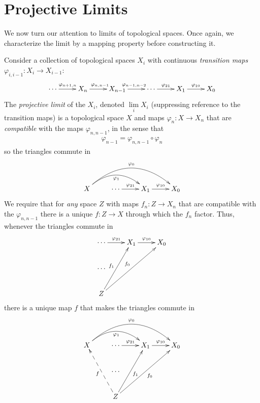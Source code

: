     \section{Projective Limits}
      We now turn our attention to limits of topological spaces.
      Once again, we characterize the limit by a mapping property before constructing it.
      \begin{defn}
        \label{defn:projlim}
        Consider a collection of topological spaces $X_i$ with continuous \emph{transition maps} $\varphi_{i,i-1}:X_i\rightarrow X_{i-1}$:
        \begin{displaymath}
          \xymatrix{
            \cdots \ar[r]^{\varphi_{n+1,n}} & X_n \ar[r]^{\varphi_{n,n-1}} & X_{n-1} \ar[r]^{\varphi_{n-1,n-2}} & \cdots \ar[r]^{\varphi_{21}} & X_1 \ar[r]^{\varphi_{10}} & X_0
          }
        \end{displaymath}
        The \emph{projective limit} of the $X_i$, denoted $\lim\limits_i X_i$ (suppressing reference to the transition maps) is a topological space $X$ and maps $\varphi_n:X\rightarrow X_n$ that are \emph{compatible} with the maps $\varphi_{n,n-1}$, in the sense that 
        \begin{align*}
          \varphi_{n-1}=\varphi_{n,n-1}\circ\varphi_n
        \end{align*}
        so the triangles commute in
        \begin{displaymath}
          \xymatrix{
            X \ar@/^20pt/[rr]_{\varphi_1} \ar@/^30pt/[rrr]^{\varphi_0}
            & \cdots \ar[r]^{\varphi_{21}}
            & X_1 \ar[r]^{\varphi_{10}}
            & X_0
          }
        \end{displaymath}
        We require that for \emph{any} space $Z$ with maps $f_n:Z\rightarrow X_n$ that are compatible with the $\varphi_{n,n-1}$ there is a unique $f:Z\rightarrow X$ through which the $f_n$ factor.
        Thus, whenever the triangles commute in
        \begin{displaymath}
          \xymatrix{
             \cdots \ar[r]^{\varphi_{21}}
            & X_1 \ar[r]^{\varphi_{10}}
            & X_0
            \\ \cdots \\
            Z \ar[uur]^{f_1} \ar[uurr]^{f_0}
          }
        \end{displaymath}
        there is a unique map $f$ that makes the triangles commute in
        \begin{displaymath}
          \xymatrix{
            X \ar@/^20pt/[rr]_{\varphi_1} \ar@/^30pt/[rrr]^{\varphi_0}
            & \cdots \ar[r]^{\varphi_{21}}
            & X_1 \ar[r]^{\varphi_{10}}
            & X_0
            \\ & \cdots \\
            & Z \ar@{-->}[uul]^f \ar[uur]_{f_1} \ar[uurr]_{f_0}
          }
        \end{displaymath}
      \end{defn}

